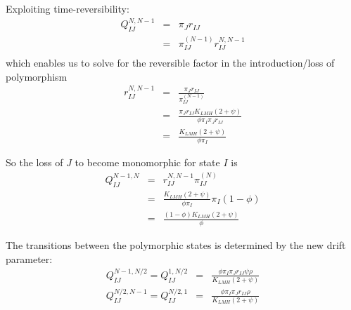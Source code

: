 \documentclass{llncs}
\newcommand{\polyProb}{\ensuremath{\phi}}}
\newcommand{\Klmh}{\ensuremath{K_{LMH}}}}
\begin{document}
Exploiting time-reversibility:
\begin{eqnarray}
    Q_{IJ}^{N,N-1} & = & \pi_J r_{IJ} \nonumber\\
    & = & \pi_{IJ}^{(N-1)} r_{IJ}^{N, N-1} \nonumber\\
\end{eqnarray}
which enables us to solve for the reversible factor in the introduction/loss of polymorphism
\begin{eqnarray}
  r_{IJ}^{N, N-1} & = & \frac{\pi_J r_{IJ}}{ \pi_{IJ}^{(N-1)}} \nonumber\\
  & = & \frac{\pi_J r_{IJ}\Klmh (2 + \psi)}{ \polyProb\pi_I\pi_J r_{IJ}} \nonumber \\
  & = & \frac{\Klmh (2 + \psi)}{ \polyProb\pi_I}
\end{eqnarray}

So the loss of  $J$ to become monomorphic for state $I$ is
\begin{eqnarray}
   Q_{IJ}^{N-1,N} & = & r_{IJ}^{N, N-1} \pi_{IJ}^{(N)} \nonumber \\
    & = & \frac{\Klmh (2 + \psi)}{ \polyProb\pi_I} \pi_I (1 -\phi) \nonumber \\
    & = & \frac{(1 -\phi) \Klmh (2 + \psi)}{ \polyProb}
\end{eqnarray}

The transitions between the polymorphic states is determined by the new drift parameter:
\begin{eqnarray}
   Q_{IJ}^{N-1,N/2} = Q_{IJ}^{1,N/2} & = & \frac{\polyProb\pi_I\pi_J r_{IJ}\psi \rho}{\Klmh (2 + \psi)} \\
   Q_{IJ}^{N/2,N-1} = Q_{IJ}^{N/2,1} & = & \frac{\polyProb\pi_I\pi_J r_{IJ} \rho}{\Klmh (2 + \psi)} 
\end{eqnarray}






\end{document}
